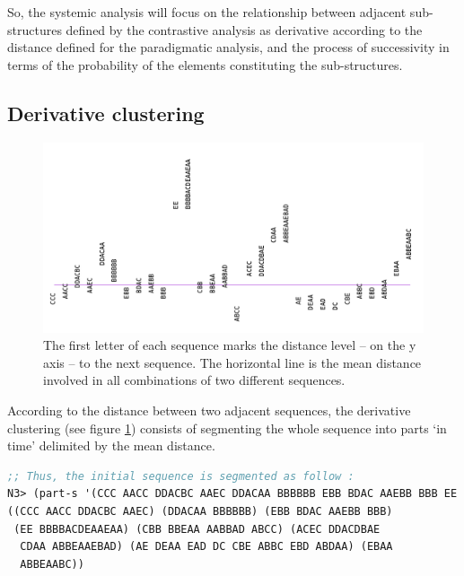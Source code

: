 \smallskip

So, the systemic analysis will focus on the relationship between adjacent sub-structures defined by the contrastive analysis as derivative according to the distance defined for the paradigmatic analysis, and the process of successivity in terms of the probability of the elements constituting the sub-structures.

\subsection{Derivative clustering}

\begin{figure}[!hbt]
	\begin{center}
		\includegraphics[scale=0.38]{img/8701}
		\caption{The first letter of each sequence marks the distance level -- on the y axis -- to the next sequence. The horizontal line is the mean distance involved in all combinations of two different sequences.}
		\label{fig:der}
	\end{center}
\end{figure}	

According to the distance between two adjacent sequences, the derivative clustering (see figure \ref{fig:der}) consists of segmenting the whole sequence into parts `in time' delimited by the mean distance.
	
	\smallskip
		
\begin{lstlisting}[language=Lisp]
;; Thus, the initial sequence is segmented as follow :
N3> (part-s '(CCC AACC DDACBC AAEC DDACAA BBBBBB EBB BDAC AAEBB BBB EE BBBBACDEAAEAA CBB BBEAA AABBAD ABCC ACEC DDACDBAE CDAA ABBEAAEBAD AE DEAA EAD DC CBE ABBC EBD ABDAA EBAA ABBEAABC DBB))
((CCC AACC DDACBC AAEC) (DDACAA BBBBBB) (EBB BDAC AAEBB BBB) 
 (EE BBBBACDEAAEAA) (CBB BBEAA AABBAD ABCC) (ACEC DDACDBAE 
  CDAA ABBEAAEBAD) (AE DEAA EAD DC CBE ABBC EBD ABDAA) (EBAA 
  ABBEAABC))
\end{lstlisting}

